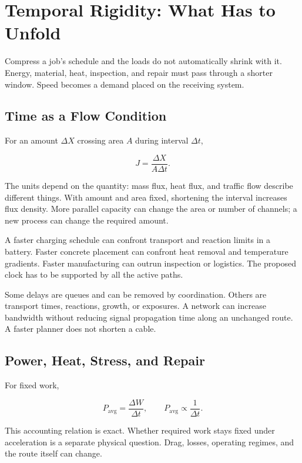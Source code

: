 \section{Temporal Rigidity: What Has to Unfold}

Compress a job's schedule and the loads do not automatically shrink with it. Energy, material, heat, inspection, and repair must pass through a shorter window. Speed becomes a demand placed on the receiving system.

\subsection{Time as a Flow Condition}

For an amount $\Delta X$ crossing area $A$ during interval $\Delta t$,

\begin{equation}
J=\frac{\Delta X}{A\Delta t}.
\label{eq:flux}
\end{equation}

The units depend on the quantity: mass flux, heat flux, and traffic flow describe different things. With amount and area fixed, shortening the interval increases flux density. More parallel capacity can change the area or number of channels; a new process can change the required amount.

A faster charging schedule can confront transport and reaction limits in a battery. Faster concrete placement can confront heat removal and temperature gradients. Faster manufacturing can outrun inspection or logistics. The proposed clock has to be supported by all the active paths.

Some delays are queues and can be removed by coordination. Others are transport times, reactions, growth, or exposures. A network can increase bandwidth without reducing signal propagation time along an unchanged route. A faster planner does not shorten a cable.

\subsection{Power, Heat, Stress, and Repair}

For fixed work,

\begin{equation}
P_{\mathrm{avg}}=\frac{\Delta W}{\Delta t},
\qquad
P_{\mathrm{avg}}\propto\frac{1}{\Delta t}.
\end{equation}

This accounting relation is exact. Whether required work stays fixed under acceleration is a separate physical question. Drag, losses, operating regimes, and the route itself can change.

